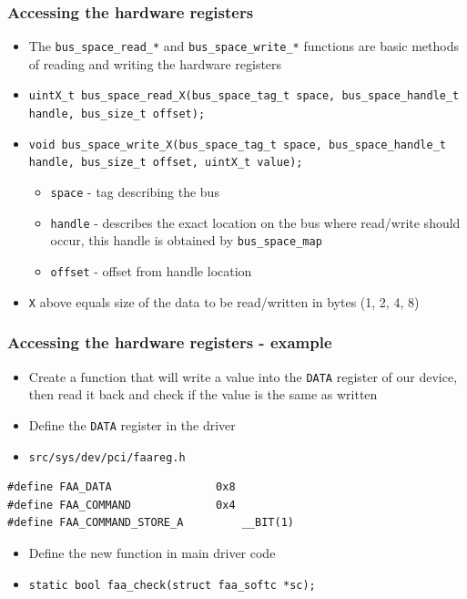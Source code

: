 \documentclass[dvipsnames,table]{beamer}
\begin{document}
\begin{frame}
\frametitle{Accessing the hardware registers}
\begin{itemize}
	\item The {\tt bus\_space\_read\_*} and {\tt bus\_space\_write\_*} functions are basic methods of reading and writing the hardware registers
	\item {\tt uintX\_t bus\_space\_read\_X(bus\_space\_tag\_t space, bus\_space\_handle\_t handle, bus\_size\_t offset);}
	\item {\tt void bus\_space\_write\_X(bus\_space\_tag\_t space, bus\_space\_handle\_t handle, bus\_size\_t offset, uintX\_t value);}
	\begin{itemize}
		\item {\tt space} - tag describing the bus
		\item {\tt handle} - describes the exact location on the bus where read/write should occur, this handle is obtained by {\tt bus\_space\_map}
		\item {\tt offset} - offset from handle location
	\end{itemize}
	\item {\tt X} above equals size of the data to be read/written in bytes (1, 2, 4, 8)
\end{itemize}
\end{frame}

\begin{frame}[fragile]
\frametitle{Accessing the hardware registers - example}
\begin{itemize}
	\item Create a function that will write a value into the {\tt DATA} register of our device, then read it back and check if the value is the same as written
	\item Define the {\tt DATA} register in the driver
	\item {\tt src/sys/dev/pci/faareg.h}
\end{itemize}
\begin{lstlisting}
#define FAA_DATA                0x8
#define FAA_COMMAND             0x4
#define FAA_COMMAND_STORE_A         __BIT(1)
\end{lstlisting}
\begin{itemize}
	\item Define the new function in main driver code
	\item {\tt static bool faa\_check(struct faa\_softc *sc);}
\end{itemize}
\end{frame}
\end{document}
